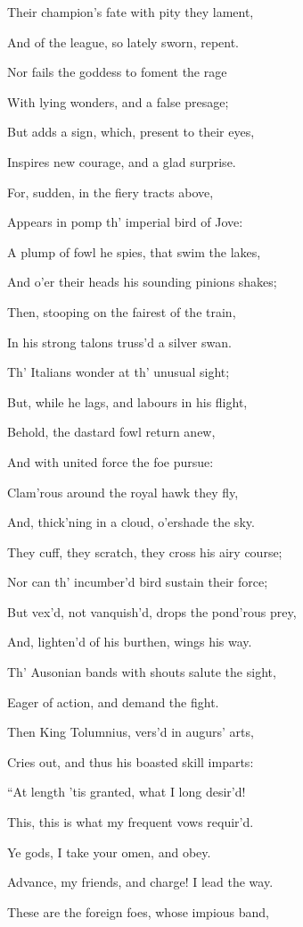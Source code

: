 Their champion’s fate with pity they lament,

And of the league, so lately sworn, repent.

Nor fails the goddess to foment the rage

With lying wonders, and a false presage;

But adds a sign, which, present to their eyes,

Inspires new courage, and a glad surprise.

For, sudden, in the fiery tracts above,

Appears in pomp th’ imperial bird of Jove:

A plump of fowl he spies, that swim the lakes,

And o’er their heads his sounding pinions shakes;

Then, stooping on the fairest of the train,

In his strong talons truss’d a silver swan.

Th’ Italians wonder at th’ unusual sight;

But, while he lags, and labours in his flight,

Behold, the dastard fowl return anew,

And with united force the foe pursue:

Clam’rous around the royal hawk they fly,

And, thick’ning in a cloud, o’ershade the sky.

They cuff, they scratch, they cross his airy course;

Nor can th’ incumber’d bird sustain their force;

But vex’d, not vanquish’d, drops the pond’rous prey,

And, lighten’d of his burthen, wings his way.

Th’ Ausonian bands with shouts salute the sight,

Eager of action, and demand the fight.

Then King Tolumnius, vers’d in augurs’ arts,

Cries out, and thus his boasted skill imparts:

“At length ’tis granted, what I long desir’d!

This, this is what my frequent vows requir’d.

Ye gods, I take your omen, and obey.

Advance, my friends, and charge! I lead the way.

These are the foreign foes, whose impious band,

